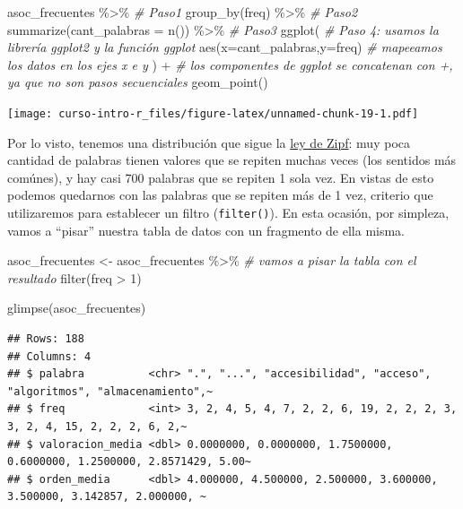\documentclass[
]{book}
\newenvironment{Shaded}{\begin{snugshade}}{\end{snugshade}}
\newcommand{\AttributeTok}[1]{\textcolor[rgb]{0.77,0.63,0.00}{#1}}
\newcommand{\CommentTok}[1]{\textcolor[rgb]{0.56,0.35,0.01}{\textit{#1}}}
\newcommand{\DecValTok}[1]{\textcolor[rgb]{0.00,0.00,0.81}{#1}}
\newcommand{\FunctionTok}[1]{\textcolor[rgb]{0.00,0.00,0.00}{#1}}
\newcommand{\NormalTok}[1]{#1}
\newcommand{\OtherTok}[1]{\textcolor[rgb]{0.56,0.35,0.01}{#1}}
\newcommand{\SpecialCharTok}[1]{\textcolor[rgb]{0.00,0.00,0.00}{#1}}
\begin{document}
\begin{Shaded}
\begin{Highlighting}[]
\NormalTok{asoc\_frecuentes }\SpecialCharTok{\%\textgreater{}\%} \CommentTok{\# Paso1}
  \FunctionTok{group\_by}\NormalTok{(freq) }\SpecialCharTok{\%\textgreater{}\%} \CommentTok{\# Paso2}
  \FunctionTok{summarize}\NormalTok{(}\AttributeTok{cant\_palabras =} \FunctionTok{n}\NormalTok{()) }\SpecialCharTok{\%\textgreater{}\%} \CommentTok{\# Paso3}
  \FunctionTok{ggplot}\NormalTok{( }\CommentTok{\# Paso 4: usamos la librería ggplot2 y la función ggplot}
    \FunctionTok{aes}\NormalTok{(}\AttributeTok{x=}\NormalTok{cant\_palabras,}\AttributeTok{y=}\NormalTok{freq) }\CommentTok{\# mapeeamos los datos en los ejes x e y}
\NormalTok{    ) }\SpecialCharTok{+} \CommentTok{\# los componentes de ggplot se concatenan con +, ya que no son pasos secuenciales}
  \FunctionTok{geom\_point}\NormalTok{()}
\end{Highlighting}
\end{Shaded}

\texttt{[image: curso-intro-r\_files/figure-latex/unnamed-chunk-19-1.pdf]}

Por lo visto, tenemos una distribución que sigue la \href{https://es.wikipedia.org/wiki/Ley_de_Zipf}{ley de Zipf}: muy poca cantidad de palabras tienen valores que se repiten muchas veces (los sentidos más comúnes), y hay casi 700 palabras que se repiten 1 sola vez. En vistas de esto podemos quedarnos con las palabras que se repiten más de 1 vez, criterio que utilizaremos para establecer un filtro (\texttt{filter()}). En esta ocasión, por simpleza, vamos a ``pisar'' nuestra tabla de datos con un fragmento de ella misma.

\begin{Shaded}
\begin{Highlighting}[]
\NormalTok{asoc\_frecuentes }\OtherTok{\textless{}{-}}\NormalTok{ asoc\_frecuentes }\SpecialCharTok{\%\textgreater{}\%} \CommentTok{\# vamos a pisar la tabla con el resultado}
  \FunctionTok{filter}\NormalTok{(freq }\SpecialCharTok{\textgreater{}} \DecValTok{1}\NormalTok{)}

\FunctionTok{glimpse}\NormalTok{(asoc\_frecuentes)}
\end{Highlighting}
\end{Shaded}

\begin{verbatim}
## Rows: 188
## Columns: 4
## $ palabra          <chr> ".", "...", "accesibilidad", "acceso", "algoritmos", "almacenamiento",~
## $ freq             <int> 3, 2, 4, 5, 4, 7, 2, 2, 6, 19, 2, 2, 2, 3, 3, 2, 4, 15, 2, 2, 2, 6, 2,~
## $ valoracion_media <dbl> 0.0000000, 0.0000000, 1.7500000, 0.6000000, 1.2500000, 2.8571429, 5.00~
## $ orden_media      <dbl> 4.000000, 4.500000, 2.500000, 3.600000, 3.500000, 3.142857, 2.000000, ~
\end{verbatim}
\end{document}
